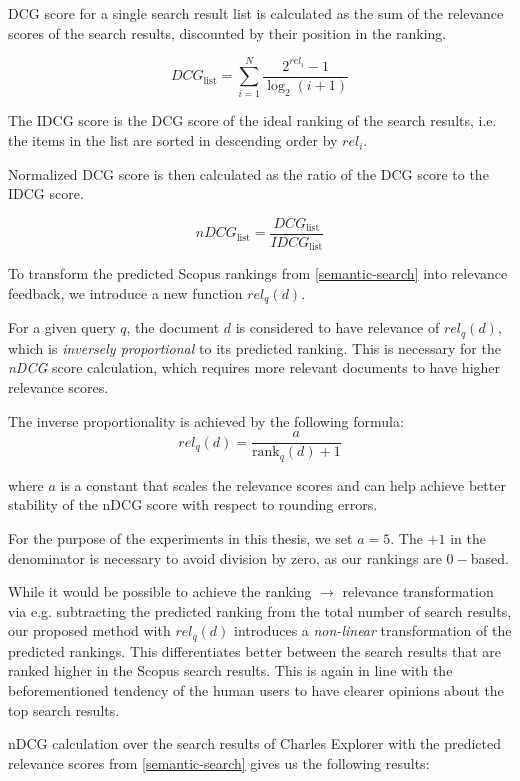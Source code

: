 DCG score for a single search result list is calculated as the sum of the relevance scores of the search results, discounted by their position in the ranking.

$$
DCG_\text{list} = \sum_{i=1}^{N} \frac{2^{rel_i} - 1}{\log_2(i + 1)}
$$

The IDCG score is the DCG score of the ideal ranking of the search results, i.e. the items in the list are sorted in descending order by $rel_i$.

Normalized DCG score is then calculated as the ratio of the DCG score to the IDCG score.

$$
nDCG_{\text{list}} = \frac{DCG_\text{list}}{IDCG_\text{list}}
$$

To transform the predicted Scopus rankings from \ref{semantic-search} into relevance feedback, 
we introduce a new function $rel_q(d)$.

For a given query $q$, the document $d$ is considered to have relevance of $rel_q(d)$, 
which is \textit{inversely proportional} to its predicted ranking. 
This is necessary for the \textit{nDCG} score calculation, which requires more relevant documents 
to have higher relevance scores.

The inverse proportionality is achieved by the following formula:
\[rel_q(d) = \frac{a}{\text{rank}_q(d) + 1}\]

where $a$ is a constant that scales the relevance scores and can help achieve better 
stability of the nDCG score with respect to rounding errors.

For the purpose of the experiments in this thesis, we set $a = 5$. 
The $+1$ in the denominator is necessary to avoid division by zero, as our rankings are $0-$based.

While it would be possible to achieve the ranking $\rightarrow$ relevance transformation via e.g. subtracting the predicted ranking from the total number of search results, 
our proposed method with $rel_q(d)$ introduces a \textit{non-linear} transformation of the predicted rankings. 
This differentiates better between the search results that are ranked higher in the Scopus search results. 
This is again in line with the beforementioned tendency of the human users to have clearer opinions about the top search results.

nDCG calculation over the search results of Charles Explorer with the predicted relevance scores from \ref{semantic-search} gives us the following results:

